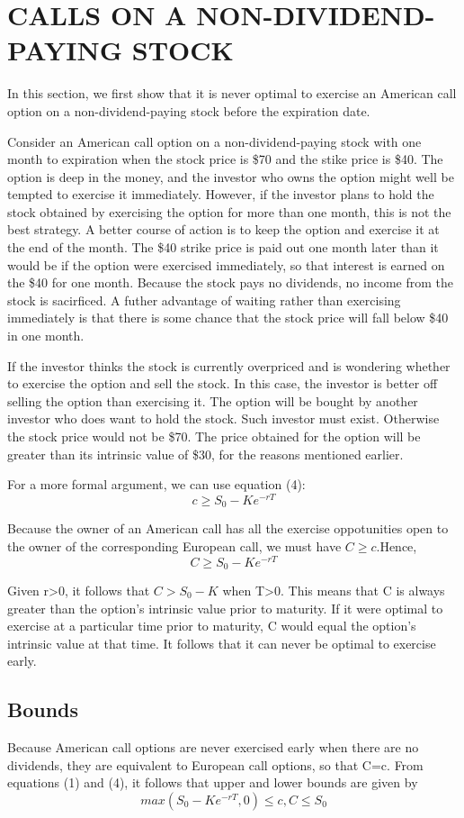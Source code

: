 \documentclass{article}
\begin{document}
\section{CALLS ON A NON-DIVIDEND-PAYING STOCK}
In this section, we first show that it is never optimal to exercise an American call option on a non-dividend-paying stock before the expiration date.

Consider an American call option on a non-dividend-paying stock with one month to expiration when the stock price is \$70 and the stike price is \$40. The option is deep in the money, and the investor who owns the option might well be tempted to exercise it immediately. However, if the investor plans to hold the stock obtained by exercising the option for more than one month, this is not the best strategy. A better course of action is to keep the option and exercise it at the end of the month. The \$40 strike price is paid out one month later than it would be if the option were exercised immediately, so that interest is earned on the \$40 for one month. Because the stock pays no dividends, no income from the stock is sacirficed. A futher advantage of waiting rather than exercising immediately is that there is some chance that the stock price will fall below \$40 in one month.

If the investor thinks the stock is currently overpriced and is wondering whether to exercise the option and sell the stock. In this case, the investor is better off selling the option than exercising it. The option will be bought by another investor who does want to hold the stock. Such investor must exist. Otherwise the stock price would not be \$70. The price obtained for the option will be greater than its intrinsic value of \$30, for the reasons mentioned earlier.

For a more formal argument, we can use equation (4):
\[
c\ge S_0-Ke^{-rT}
\]

Because the owner of an American call has all the exercise oppotunities open to the owner of the corresponding European call, we must have $ C\ge c $.Hence,
\[
C\ge S_0-Ke^{-rT}
\]

Given r>0, it follows that $ C>S_0-K $ when T>0. This means that C is always greater than the option's intrinsic value prior to maturity. If it were optimal to exercise at a particular time prior to maturity, C would equal the option's intrinsic value at that time. It follows that it can never be optimal to exercise early.

\subsection{Bounds}
Because American call options are never exercised early when there are no dividends, they are equivalent to European call options, so that C=c. From equations (1) and (4), it follows that upper and lower bounds are given by
\[
max(S_0-Ke^{-rT},0)\le c,C\le S_0
\]
\end{document}

